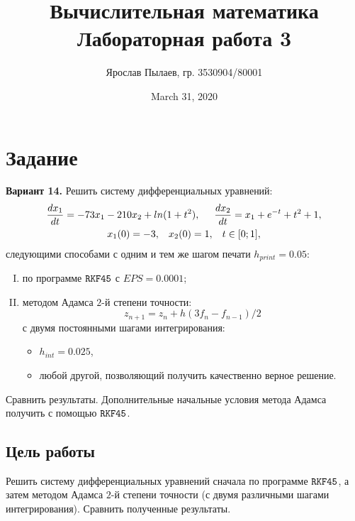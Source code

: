 \documentclass[a4paper,11pt]{article}
\title{Вычислительная математика \\ Лабораторная работа 3}
\author{Ярослав Пылаев, гр. 3530904/80001}
\date{March 31, 2020}
\begin{document}
\maketitle
\newpage

\section{Задание}
\noindent \textbf{Вариант 14.} Решить систему дифференциальных уравнений:
  \begin{gather*}
      \frac{dx_1}{dt} = -73x_1 - 210x_2 + ln(1 + t^2), \hspace{5mm}
      \frac{dx_2}{dt} = x_1 + e^{-t} + t^2 + 1, \\
    x_1(0) = -3, \hspace{3mm} x_2(0) = 1, \hspace{3mm} t \in [0; 1],
  \end{gather*}
  следующими способами с одним и тем же шагом печати $h_{print} = 0.05$:
  \begin{enumerate}[I.]
    \item по программе $\verb|RKF45|$ с $EPS = 0.0001$;
    \item методом Адамса $2$-й степени точности: \[z_{n+1} = z_n + h(3f_n - f_{n-1}) / 2\]
          с двумя постоянными шагами интегрирования:
          \begin{itemize}
            \item $h_{int} = 0.025$,
            \item любой другой, позволяющий получить качественно верное решение.
          \end{itemize}
  \end{enumerate}

  \noindent Сравнить результаты. Дополнительные начальные условия метода Адамса получить с помощью $\verb|RKF45|$.

\subsection{Цель работы}
\noindent Решить систему дифференциальных уравнений сначала по программе $\verb|RKF45|$, а затем методом
      Адамса $2$-й степени точности (с двумя различными шагами интегрирования). Сравнить полученные результаты.
\end{document}
